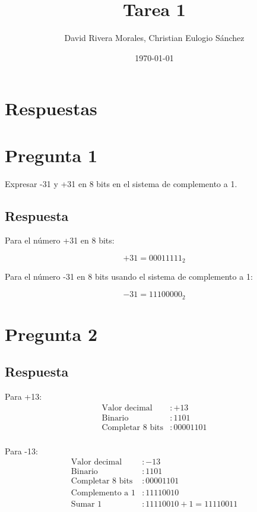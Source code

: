 \documentclass{article}
\begin{document}


\newpage
\title{Tarea 1}
\author{David Rivera Morales, Christian Eulogio Sánchez}
\date{\today}

\maketitle
\section*{Respuestas}


\section*{Pregunta 1}
Expresar -31 y +31 en 8 bits en el sistema de complemento a 1.

\subsection*{Respuesta}
Para el número +31 en 8 bits:

\[
+31 = 00011111_{2}
\]

Para el número -31 en 8 bits usando el sistema de complemento a 1:

\[
-31 = 11100000_{2}
\]

\section*{Pregunta 2}

\subsection*{Respuesta}
Para +13:
\begin{align*}
\text{Valor decimal} & : +13 \\
\text{Binario} & : 1101 \\
\text{Completar 8 bits} & : 00001101 \\
\end{align*}

Para -13:
\begin{align*}
\text{Valor decimal} & : -13 \\
\text{Binario} & : 1101 \\
\text{Completar 8 bits} & : 00001101 \\
\text{Complemento a 1} & : 11110010 \\
\text{Sumar 1} & : 11110010 + 1 = 11110011 \\
\end{align*}
\end{document}
